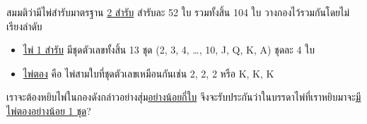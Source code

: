 \question{}

สมมติว่ามีไพ่สำรับมาตรฐาน \uline{2 สำรับ} สำรับละ 52 ใบ รวมทั้งสิ้น 104 ใบ วางกองไว้รวมกันโดยไม่เรียงลำดับ

\begin{itemize}
    \item \uline{ไพ่ 1 สำรับ} มีชุดตัวเลขทั้งสิ้น 13 ชุด (2, 3, 4, \ldots, 10, J, Q, K, A) ชุดละ 4 ใบ
    \item \uline{ไพ่ตอง} คือ ไพ่สามใบที่ชุดตัวเลขเหมือนกันเช่น 2, 2, 2 หรือ K, K, K
\end{itemize}

เราจะต้องหยิบไพ่ในกองดังกล่าวอย่างสุ่ม\uline{อย่างน้อยกี่ใบ} จึงจะรับประกันว่าในบรรดาไพ่ที่เราหยิบมาจะ\uline{มีไพ่ตองอย่างน้อย 1 ชุด}?